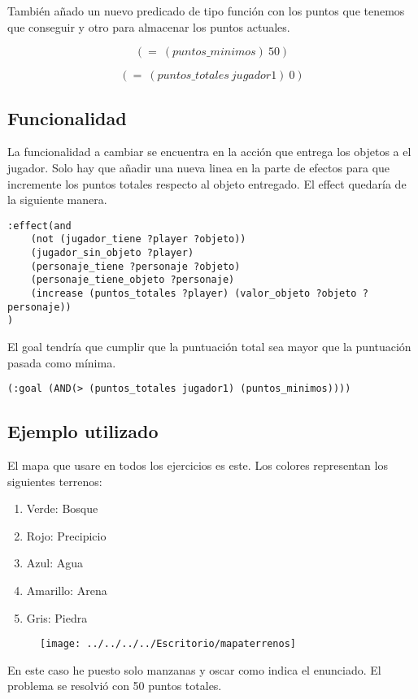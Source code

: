 \documentclass[]{article}
\begin{document}
También añado un nuevo predicado de tipo función con los puntos que tenemos que conseguir y otro para almacenar los puntos actuales. 

$$
(=\ (puntos\_minimos)\ 50)
$$

$$
(=\ (puntos\_totales\ jugador1)\ 0)
$$




\subsection{Funcionalidad}
La funcionalidad a cambiar se encuentra en la acción que entrega los objetos a el jugador.
Solo hay que añadir una nueva linea en la parte de efectos para que incremente los puntos totales respecto al objeto entregado. El effect quedaría de la siguiente manera.
	\begin{lstlisting}
:effect(and 
	(not (jugador_tiene ?player ?objeto))
	(jugador_sin_objeto ?player)
	(personaje_tiene ?personaje ?objeto)
	(personaje_tiene_objeto ?personaje)
	(increase (puntos_totales ?player) (valor_objeto ?objeto ?personaje))
)
	\end{lstlisting}
	
El goal tendría que cumplir que la puntuación total sea mayor que la puntuación pasada como mínima.

	
	\begin{lstlisting}
(:goal (AND(> (puntos_totales jugador1) (puntos_minimos))))
	\end{lstlisting}
\newpage

\subsection{Ejemplo utilizado}
El mapa que usare en todos los ejercicios es este. Los colores representan los siguientes terrenos:
\begin{enumerate}
	\item{Verde:} Bosque
	\item{Rojo:} Precipicio
	\item{Azul:} Agua
	\item{Amarillo:} Arena
	\item{Gris:} Piedra
\end{enumerate}

\begin{figure}[H]
	\centering
	\texttt{[image: ../../../../Escritorio/mapaterrenos]}
\end{figure}

En este caso he puesto solo manzanas y oscar como indica el enunciado. El problema se resolvió con 50 puntos totales.
\end{document}
